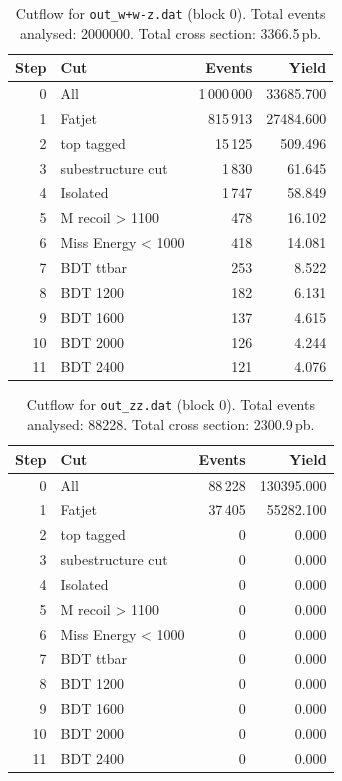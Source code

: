 \documentclass{article}
\begin{document}
\begin{table}[H]
\centering
\begin{tabular}{r l r r}
\toprule
Step & Cut & Events & Yield \\
\midrule
0 & All & 1\,000\,000 & 33685.700 \\
1 & Fatjet & 815\,913 & 27484.600 \\
2 & top tagged & 15\,125 & 509.496 \\
3 & subestructure cut & 1\,830 & 61.645 \\
4 & Isolated & 1\,747 & 58.849 \\
5 & M recoil > 1100 & 478 & 16.102 \\
6 & Miss Energy < 1000 & 418 & 14.081 \\
7 & BDT ttbar & 253 & 8.522 \\
8 & BDT 1200 & 182 & 6.131 \\
9 & BDT 1600 & 137 & 4.615 \\
10 & BDT 2000 & 126 & 4.244 \\
11 & BDT 2400 & 121 & 4.076 \\
\bottomrule
\end{tabular}
\caption{Cutflow for \texttt{out\_w+w-z.dat} (block 0). Total events analysed: 2000000. Total cross section: 3366.5\,pb.}
\label{tab:cutflow-out-w-w-z-dat}
\end{table}

\begin{table}[H]
\centering
\begin{tabular}{r l r r}
\toprule
Step & Cut & Events & Yield \\
\midrule
0 & All & 88\,228 & 130395.000 \\
1 & Fatjet & 37\,405 & 55282.100 \\
2 & top tagged & 0 & 0.000 \\
3 & subestructure cut & 0 & 0.000 \\
4 & Isolated & 0 & 0.000 \\
5 & M recoil > 1100 & 0 & 0.000 \\
6 & Miss Energy < 1000 & 0 & 0.000 \\
7 & BDT ttbar & 0 & 0.000 \\
8 & BDT 1200 & 0 & 0.000 \\
9 & BDT 1600 & 0 & 0.000 \\
10 & BDT 2000 & 0 & 0.000 \\
11 & BDT 2400 & 0 & 0.000 \\
\bottomrule
\end{tabular}
\caption{Cutflow for \texttt{out\_zz.dat} (block 0). Total events analysed: 88228. Total cross section: 2300.9\,pb.}
\label{tab:cutflow-out-zz-dat}
\end{table}
\end{document}
